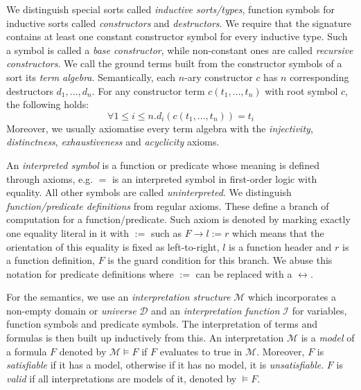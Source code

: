 We distinguish special sorts called \textit{inductive sorts/types}, function symbols for inductive sorts called \textit{constructors} and \textit{destructors}. We require that the signature contains at least one constant constructor symbol for every inductive type. Such a symbol is called a \textit{base constructor}, while non-constant ones are called \textit{recursive constructors}. We call the ground terms built from the constructor symbols of a sort its \textit{term algebra}. Semantically, each $n$-ary constructor $c$ has $n$ corresponding destructors $d_1,...,d_n$. For any constructor term $c(t_1,...,t_n)$ with root symbol $c$, the following holds:
$$\forall 1\le i\le n. d_i(c(t_1,...,t_n))=t_i$$
Moreover, we usually axiomatise every term algebra with the \textit{injectivity}, \textit{distinctness}, \textit{exhaustiveness} and \textit{acyclicity} axioms.

An \textit{interpreted symbol} is a function or predicate whose meaning is defined through axioms, e.g. $=$ is an interpreted symbol in first-order logic with equality. All other symbols are called \textit{uninterpreted}. We distinguish \textit{function/predicate definitions} from regular axioms. These define a branch of computation for a function/predicate. Such axiom is denoted by marking exactly one equality literal in it with $:=$ such as $F\rightarrow l:=r$ which means that the orientation of this equality is fixed as left-to-right, $l$ is a function header and $r$ is a function definition, $F$ is the guard condition for this branch. We abuse this notation for predicate definitions where $:=$ can be replaced with a $\leftrightarrow$.

For the semantics, we use an \textit{interpretation structure} $\mathcal{M}$ which incorporates a non-empty domain or \textit{universe} $\mathcal{D}$ and an \textit{interpretation function} $\mathcal{I}$ for variables, function symbols and predicate symbols. The interpretation of terms and formulas is then built up inductively from this. An interpretation $\mathcal{M}$ is a \textit{model} of a formula $F$ denoted by $\mathcal{M}\models F$ if $F$ evaluates to true in $\mathcal{M}$. Moreover, $F$ is \textit{satisfiable} if it has a model, otherwise if it has no model, it is \textit{unsatisfiable}. $F$ is \textit{valid} if all interpretations are models of it, denoted by $\models F$.

